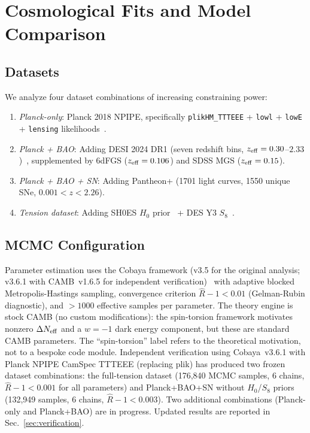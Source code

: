 \documentclass[aps,prd,twocolumn,superscriptaddress,showpacs,preprintnumbers,nofootinbib,longbibliography,floatfix]{revtex4-2}
\newcommand{\Neff}{N_{\rm eff}}
\begin{document}
\section{Cosmological Fits and Model Comparison}\label{sec:cosmo_fits}

\subsection{Datasets}

We analyze four dataset combinations of increasing constraining power:
\begin{enumerate}[leftmargin=*]
\item \textit{Planck-only}: Planck 2018 NPIPE, specifically \texttt{plikHM\_TTTEEE} + \texttt{lowl} + \texttt{lowE} + \texttt{lensing} likelihoods~\cite{Planck2018params}.
\item \textit{Planck + BAO}: Adding DESI 2024 DR1 (seven redshift bins, $z_{\rm eff} = 0.30$--$2.33$)~\cite{DESI2024}, supplemented by 6dFGS ($z_{\rm eff}=0.106$) and SDSS MGS ($z_{\rm eff}=0.15$).
\item \textit{Planck + BAO + SN}: Adding Pantheon+ (1701 light curves, 1550 unique SNe, $0.001 < z < 2.26$).
\item \textit{Tension dataset}: Adding SH0ES $H_0$ prior~\cite{Riess2022} + DES Y3 $S_8$~\cite{DES2024}.
\end{enumerate}

\subsection{MCMC Configuration}

Parameter estimation uses the Cobaya framework (v3.5 for the original analysis; v3.6.1 with CAMB~v1.6.5 for independent verification)~\cite{Cobaya2021} with adaptive blocked Metropolis-Hastings sampling, convergence criterion $\hat{R}-1 < 0.01$ (Gelman-Rubin diagnostic), and $>1000$ effective samples per parameter. The theory engine is stock CAMB (no custom modifications): the spin-torsion framework motivates nonzero $\Delta\Neff$ and a $w=-1$ dark energy component, but these are standard CAMB parameters. The ``spin-torsion'' label refers to the theoretical motivation, not to a bespoke code module. Independent verification using Cobaya~v3.6.1 with Planck NPIPE CamSpec TTTEEE (replacing plik) has produced two frozen dataset combinations: the full-tension dataset (176{,}840 MCMC samples, 6 chains, $\hat{R}-1 < 0.001$ for all parameters) and Planck+BAO+SN without $H_0$/$S_8$ priors (132{,}949 samples, 6 chains, $\hat{R}-1 < 0.003$). Two additional combinations (Planck-only and Planck+BAO) are in progress. Updated results are reported in Sec.~\ref{sec:verification}.
\end{document}
